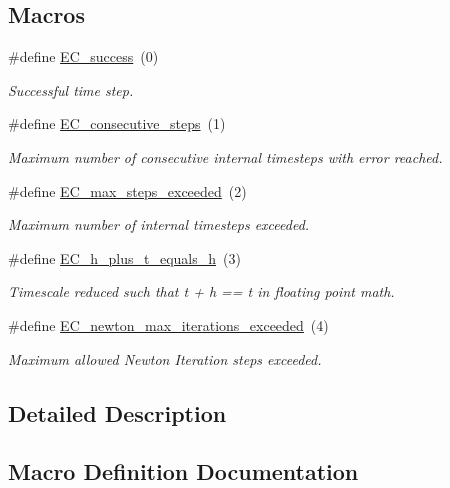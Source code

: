 \subsection*{Macros}
\begin{DoxyCompactItemize}
\item 
\#define \hyperlink{group__RKCU__ErrCodes_gabd83bc0f9f475a2189a4db4a08b790ca}{E\+C\+\_\+success}~(0)
\begin{DoxyCompactList}\small\item\em Successful time step. \end{DoxyCompactList}\item 
\#define \hyperlink{group__RKCU__ErrCodes_gae0287841c08f86f5709660fd731615ad}{E\+C\+\_\+consecutive\+\_\+steps}~(1)
\begin{DoxyCompactList}\small\item\em Maximum number of consecutive internal timesteps with error reached. \end{DoxyCompactList}\item 
\#define \hyperlink{group__RKCU__ErrCodes_ga0f0275d9851ab5c19b79a963d5084df3}{E\+C\+\_\+max\+\_\+steps\+\_\+exceeded}~(2)
\begin{DoxyCompactList}\small\item\em Maximum number of internal timesteps exceeded. \end{DoxyCompactList}\item 
\#define \hyperlink{group__RKCU__ErrCodes_ga9326efd544880e2683c4453365ca2704}{E\+C\+\_\+h\+\_\+plus\+\_\+t\+\_\+equals\+\_\+h}~(3)
\begin{DoxyCompactList}\small\item\em Timescale reduced such that t + h == t in floating point math. \end{DoxyCompactList}\item 
\#define \hyperlink{group__RKCU__ErrCodes_gaae2906abd9ae8a2791c2e8626ca73a32}{E\+C\+\_\+newton\+\_\+max\+\_\+iterations\+\_\+exceeded}~(4)
\begin{DoxyCompactList}\small\item\em Maximum allowed Newton Iteration steps exceeded. \end{DoxyCompactList}\end{DoxyCompactItemize}


\subsection{Detailed Description}


\subsection{Macro Definition Documentation}
